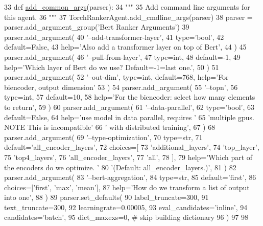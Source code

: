 \begin{DoxyCode}
33 \textcolor{keyword}{def }\hyperlink{namespaceparlai_1_1agents_1_1bert__ranker_1_1helpers_ac2e926c3aba3a62be09e2c37dffcaee2}{add\_common\_args}(parser):
34     \textcolor{stringliteral}{"""}
35 \textcolor{stringliteral}{    Add command line arguments for this agent.}
36 \textcolor{stringliteral}{    """}
37     TorchRankerAgent.add\_cmdline\_args(parser)
38     parser = parser.add\_argument\_group(\textcolor{stringliteral}{'Bert Ranker Arguments'})
39     parser.add\_argument(
40         \textcolor{stringliteral}{'--add-transformer-layer'},
41         type=\textcolor{stringliteral}{'bool'},
42         default=\textcolor{keyword}{False},
43         help=\textcolor{stringliteral}{'Also add a transformer layer on top of Bert'},
44     )
45     parser.add\_argument(
46         \textcolor{stringliteral}{'--pull-from-layer'},
47         type=int,
48         default=-1,
49         help=\textcolor{stringliteral}{'Which layer of Bert do we use? Default=-1=last one.'},
50     )
51     parser.add\_argument(
52         \textcolor{stringliteral}{'--out-dim'}, type=int, default=768, help=\textcolor{stringliteral}{'For biencoder, output dimension'}
53     )
54     parser.add\_argument(
55         \textcolor{stringliteral}{'--topn'},
56         type=int,
57         default=10,
58         help=\textcolor{stringliteral}{'For the biencoder: select how many elements to return'},
59     )
60     parser.add\_argument(
61         \textcolor{stringliteral}{'--data-parallel'},
62         type=\textcolor{stringliteral}{'bool'},
63         default=\textcolor{keyword}{False},
64         help=\textcolor{stringliteral}{'use model in data parallel, requires '}
65         \textcolor{stringliteral}{'multiple gpus. NOTE This is incompatible'}
66         \textcolor{stringliteral}{' with distributed training'},
67     )
68     parser.add\_argument(
69         \textcolor{stringliteral}{'--type-optimization'},
70         type=str,
71         default=\textcolor{stringliteral}{'all\_encoder\_layers'},
72         choices=[
73             \textcolor{stringliteral}{'additional\_layers'},
74             \textcolor{stringliteral}{'top\_layer'},
75             \textcolor{stringliteral}{'top4\_layers'},
76             \textcolor{stringliteral}{'all\_encoder\_layers'},
77             \textcolor{stringliteral}{'all'},
78         ],
79         help=\textcolor{stringliteral}{'Which part of the encoders do we optimize. '}
80         \textcolor{stringliteral}{'(Default: all\_encoder\_layers.)'},
81     )
82     parser.add\_argument(
83         \textcolor{stringliteral}{'--bert-aggregation'},
84         type=str,
85         default=\textcolor{stringliteral}{'first'},
86         choices=[\textcolor{stringliteral}{'first'}, \textcolor{stringliteral}{'max'}, \textcolor{stringliteral}{'mean'}],
87         help=\textcolor{stringliteral}{'How do we transform a list of output into one'},
88     )
89     parser.set\_defaults(
90         label\_truncate=300,
91         text\_truncate=300,
92         learningrate=0.00005,
93         eval\_candidates=\textcolor{stringliteral}{'inline'},
94         candidates=\textcolor{stringliteral}{'batch'},
95         dict\_maxexs=0,  \textcolor{comment}{# skip building dictionary}
96     )
97 
98 
\end{DoxyCode}
